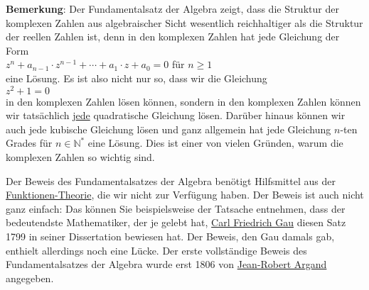 \noindent
\textbf{Bemerkung}: Der Fundamentalsatz der Algebra zeigt, dass die Struktur der komplexen Zahlen
aus algebraischer Sicht wesentlich reichhaltiger als die Struktur der reellen Zahlen ist, denn in
den komplexen Zahlen hat jede Gleichung der Form
\\[0.2cm]
\hspace*{1.3cm}
$z^n + a_{n-1} \cdot z^{n-1} + \cdots + a_1 \cdot z + a_0 = 0$ \quad f\"{u}r $n \geq 1$
\\[0.2cm]
eine L\"{o}sung.  Es ist also nicht nur so, dass wir die Gleichung
\\[0.2cm]
\hspace*{1.3cm}
$z^2 + 1 = 0$
\\[0.2cm]
in den komplexen Zahlen l\"{o}sen k\"{o}nnen, sondern in den komplexen Zahlen k\"{o}nnen wir tats\"{a}chlich
{\color{red}j\underline{ede}} quadratische Gleichung l\"{o}sen.  Dar\"{u}ber hinaus k\"{o}nnen wir auch jede kubische
Gleichung l\"{o}sen und ganz allgemein hat jede Gleichung $n$-ten Grades f\"ur $n\in \mathbb{N}^*$
eine L\"{o}sung.  Dies ist einer von vielen Gr\"{u}nden, warum die komplexen Zahlen so wichtig sind. 
\vspace*{0.2cm}

\noindent
Der Beweis des Fundamentalsatzes der Algebra ben\"{o}tigt Hilfsmittel aus der
\href{https://de.wikipedia.org/wiki/Funktionentheorie}{Funktionen-Theorie}, die wir nicht 
zur Verf\"{u}gung haben.  Der Beweis ist auch nicht ganz einfach: Das k\"{o}nnen Sie beispielsweise der
Tatsache entnehmen, dass der bedeutendste Mathematiker, der je gelebt hat, 
\href{http://de.wikipedia.org/wiki/Carl_Friedrich_Gauss}{Carl Friedrich Gau\3}
diesen Satz 1799 in seiner Dissertation bewiesen hat.  Der Beweis, den Gau\3 damals gab, enthielt
allerdings noch eine L\"{u}cke.  Der erste vollst\"{a}ndige Beweis des Fundamentalsatzes der Algebra wurde 
erst 1806 von \href{http://en.wikipedia.org/wiki/Jean-Robert_Argand}{Jean-Robert Argand} angegeben.

